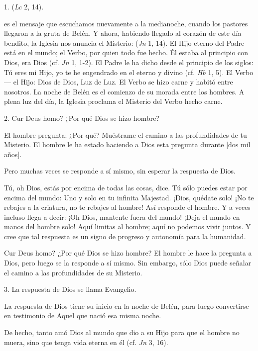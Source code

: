 \begin{body}
	1.  (\emph{Lc} 2, 14).
	
	 es el mensaje que escuchamos nuevamente a la medianoche, cuando los pastores llegaron a la gruta de Belén. Y ahora, habiendo llegado al corazón de este día bendito, la Iglesia nos anuncia el Misterio:  (\emph{Jn} 1, 14). El Hijo eterno del Padre está en el mundo; el Verbo, por quien todo fue hecho. Él estaba al principio con Dios, era Dios (cf. \emph{Jn} 1, 1-2). El Padre le ha dicho desde el principio de los siglos: Tú eres mi Hijo, yo te he engendrado en el  eterno y divino (cf. \emph{Hb} 1, 5). El Verbo --- el Hijo: Dios de Dios, Luz de Luz. El Verbo se hizo carne y habitó entre nosotros. La noche de Belén es el comienzo de su morada entre los hombres. A plena luz del día, la Iglesia proclama el Misterio del Verbo hecho carne.
	
	2. Cur Deus homo? ¿Por qué Dios se hizo hombre?
	
	El hombre pregunta: ¿Por qué? Muéstrame el camino a las profundidades de tu Misterio. El hombre le ha estado haciendo a Dios esta pregunta durante {[}dos mil años{]}.
	
	Pero muchas veces se responde a sí mismo, sin esperar la respuesta de Dios.
	
	Tú, oh Dios, estás por encima de todas las cosas, dice. Tú sólo puedes estar por encima del mundo: Uno y solo en tu infinita Majestad. ¡Dios, quédate solo! ¡No te rebajes a la criatura, no te rebajes al hombre! Así responde el hombre. Y a veces incluso llega a decir: ¡Oh Dios, mantente fuera del mundo! ¡Deja el mundo en manos del hombre solo! Aquí limitas al hombre; aquí no podemos vivir juntos. Y cree que tal respuesta es un signo de progreso y autonomía para la humanidad.
	
	Cur Deus homo? ¿Por qué Dios se hizo hombre? El hombre le hace la pregunta a Dios, pero luego se la responde a sí mismo. Sin embargo, sólo Dios puede señalar el camino a las profundidades de su Misterio.
	
	3. La respuesta de Dios se llama Evangelio.
	
	La respuesta de Dios tiene su inicio en la noche de Belén, para luego convertirse en testimonio de Aquel que nació esa misma noche.
	
	De hecho, tanto amó Dios al mundo que dio a su Hijo para que el hombre no muera, sino que tenga vida eterna en él (cf. \emph{Jn} 3, 16).
	

\end{body}
